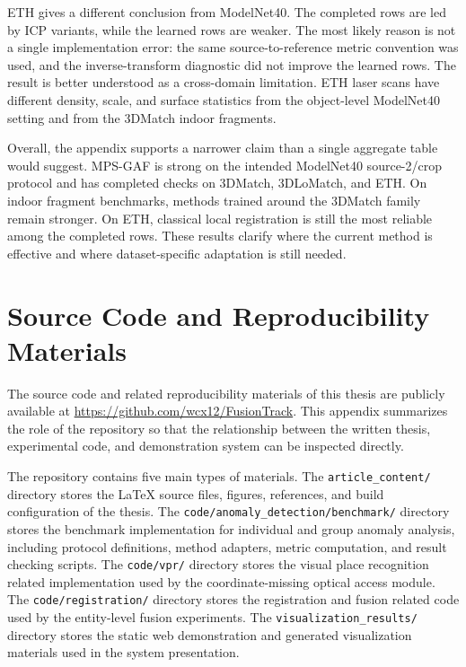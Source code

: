 ETH gives a different conclusion from ModelNet40. The completed rows are led by ICP variants, while the learned rows are weaker. The most likely reason is not a single implementation error: the same source-to-reference metric convention was used, and the inverse-transform diagnostic did not improve the learned rows. The result is better understood as a cross-domain limitation. ETH laser scans have different density, scale, and surface statistics from the object-level ModelNet40 setting and from the 3DMatch indoor fragments.

Overall, the appendix supports a narrower claim than a single aggregate table would suggest. MPS-GAF is strong on the intended ModelNet40 source-2/crop protocol and has completed checks on 3DMatch, 3DLoMatch, and ETH. On indoor fragment benchmarks, methods trained around the 3DMatch family remain stronger. On ETH, classical local registration is still the most reliable among the completed rows. These results clarify where the current method is effective and where dataset-specific adaptation is still needed.

\chapter{Source Code and Reproducibility Materials}
\label{chap:appendix-source-code}

The source code and related reproducibility materials of this thesis are publicly available at \url{https://github.com/wcx12/FusionTrack}. This appendix summarizes the role of the repository so that the relationship between the written thesis, experimental code, and demonstration system can be inspected directly.

The repository contains five main types of materials. The \texttt{article\_content/} directory stores the LaTeX source files, figures, references, and build configuration of the thesis. The \texttt{code/anomaly\_detection/benchmark/} directory stores the benchmark implementation for individual and group anomaly analysis, including protocol definitions, method adapters, metric computation, and result checking scripts. The \texttt{code/vpr/} directory stores the visual place recognition related implementation used by the coordinate-missing optical access module. The \texttt{code/registration/} directory stores the registration and fusion related code used by the entity-level fusion experiments. The \texttt{visualization\_results/} directory stores the static web demonstration and generated visualization materials used in the system presentation.

